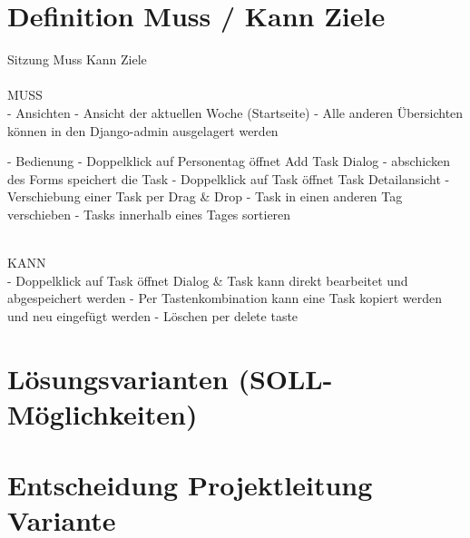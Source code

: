 \section{Definition Muss / Kann Ziele}
Sitzung Muss Kann Ziele\\
\\
MUSS\\
- Ansichten
    - Ansicht der aktuellen Woche (Startseite)
    - Alle anderen Übersichten können in den Django-admin ausgelagert werden


- Bedienung
    - Doppelklick auf Personentag öffnet Add Task Dialog
        - abschicken des Forms speichert die Task
    - Doppelklick auf Task öffnet Task Detailansicht
    - Verschiebung einer Task per Drag & Drop
        - Task in einen anderen Tag verschieben
        - Tasks innerhalb eines Tages sortieren

\\
KANN\\
- Doppelklick auf Task öffnet Dialog & Task kann direkt bearbeitet und abgespeichert werden
- Per Tastenkombination kann eine Task kopiert werden und neu eingefügt werden
- Löschen per delete taste

\section{Lösungsvarianten (SOLL-Möglichkeiten)}

\section{Entscheidung Projektleitung Variante}
